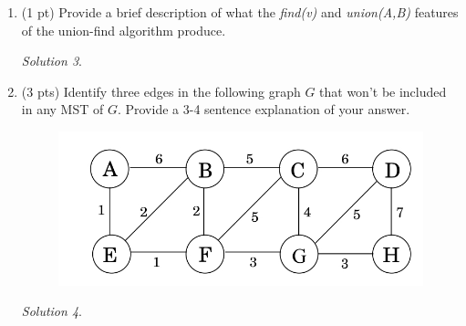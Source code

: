 \documentclass[12pt]{article}
\theoremstyle{remark}
\newtheorem*{solution}{Solution}
\begin{document}
\begin{enumerate}
\begin{enumerate}[label=(\alph*)]
\begin{solution}
\end{solution}


\item (2 pts) Find two vertices $u$ and $v$, where the $u-v$ path in the Kruskal tree is not a shortest $u-v$ path.
\begin{solution}

\end{solution}

\end{enumerate}

\pagebreak
\item (1 pt) Provide a brief description of what the \textit{find(v)} and \textit{union(A,B)} features of the union-find algorithm produce. 
\begin{solution}

\end{solution}

\item (3 pts) Identify three edges in the following graph $G$ that won't be included in any MST of $G$. Provide a 3-4 sentence explanation of your answer.  
\begin{figure}[h!]
\begin{center}
\includegraphics[scale=0.3]{mst_graph_q2.jpg} 
\end{center}
\end{figure}
\begin{solution}

\end{solution}


\end{enumerate}
\end{document}
